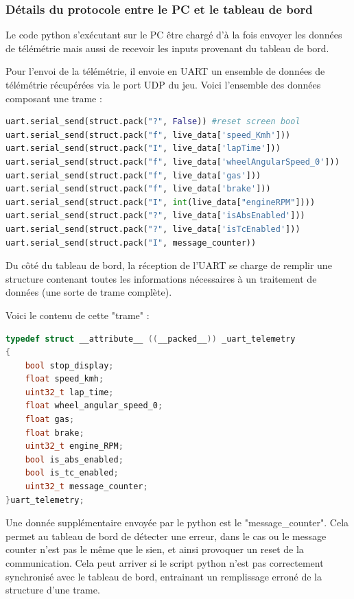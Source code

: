 \documentclass[french, 11pt]{article}
\begin{document}

		\subsubsection{Détails du protocole entre le PC et le tableau de bord}
		\label{telemetrie}

			Le code python s'exécutant sur le PC être chargé d'à la fois envoyer les données de télémétrie mais aussi de recevoir les inputs provenant du tableau de bord.

			Pour l'envoi de la télémétrie, il envoie en UART un ensemble de données de télémétrie récupérées via le port UDP du jeu. Voici l'ensemble des données composant une trame :

			\begin{lstlisting}[language=python, caption=Données télémétriques envoyées par le python]
uart.serial_send(struct.pack("?", False)) #reset screen bool
uart.serial_send(struct.pack("f", live_data['speed_Kmh']))
uart.serial_send(struct.pack("I", live_data['lapTime']))
uart.serial_send(struct.pack("f", live_data['wheelAngularSpeed_0']))
uart.serial_send(struct.pack("f", live_data['gas']))
uart.serial_send(struct.pack("f", live_data['brake']))
uart.serial_send(struct.pack("I", int(live_data["engineRPM"])))
uart.serial_send(struct.pack("?", live_data['isAbsEnabled']))
uart.serial_send(struct.pack("?", live_data['isTcEnabled']))
uart.serial_send(struct.pack("I", message_counter))
			\end{lstlisting}

			Du côté du tableau de bord, la réception de l'UART se charge de remplir une structure contenant toutes les informations nécessaires à un traitement de données (une sorte de trame complète).

			Voici le contenu de cette "trame" : 

			\begin{lstlisting}[language=c, caption=Contenu d'une "trame" de données télémétriques côté tableau de bord]
typedef struct __attribute__ ((__packed__)) _uart_telemetry
{
	bool stop_display;
	float speed_kmh;
	uint32_t lap_time;
	float wheel_angular_speed_0;
	float gas;
	float brake;
	uint32_t engine_RPM;
	bool is_abs_enabled;
	bool is_tc_enabled;
	uint32_t message_counter;
}uart_telemetry;
			\end{lstlisting}

		
			Une donnée supplémentaire envoyée par le python est le "message\_counter". Cela permet au tableau de bord de détecter une erreur, dans le cas ou le message counter n'est pas le même que le sien, et ainsi provoquer un reset de la communication. Cela peut arriver si le script python n'est pas correctement synchronisé avec le tableau de bord, entrainant un remplissage erroné de la structure d'une trame.
\end{document}
